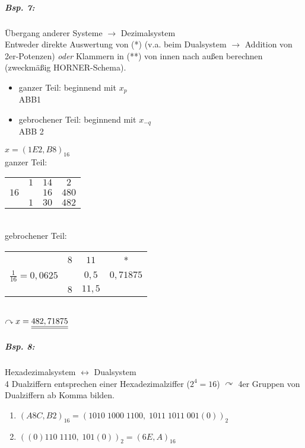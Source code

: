 \subparagraph{Bsp. 7:} Übergang anderer Systeme $\rightarrow$ Dezimalsystem\\
Entweder direkte Auswertung von (*) (v.a. beim Dualsystem $\rightarrow$ Addition von 2er-Potenzen) \emph{oder} Klammern in (**) von innen nach außen berechnen (zweckmäßig HORNER-Schema).
\begin{itemize}
\item ganzer Teil: beginnend mit $x_p$\\
ABB1 
\item gebrochener Teil: beginnend mit $x_{-q}$\\
ABB 2
\end{itemize}
$x=(1E2,B8)_{16}$\\
ganzer Teil:\\
\begin{tabular}{c | c c c}
 & $1$  &  $14$  & $2$\\
 $16$  &   & $16$  & $480$\\
 \hline
  & $1$ & $30$ & $\boxed{482}$\\

\end{tabular}\\
gebrochener Teil:\\
\begin{tabular}{c | c c c}
 & $8$  &  $11$  & *\\
 $\frac{1}{16}=0,0625$  &   & $0,5$  & $\boxed{0,71875}$\\
 \hline
  & $8$ & $11,5$ & \\
\end{tabular}\\
$\curvearrowright x=\underline{\underline{482,71875}}$

\subparagraph{Bsp. 8:} Hexadezimalsystem $\leftrightarrow$ Dualsystem\\
4 Dualziffern entsprechen einer Hexadezimalziffer ($2^4=16$) $\curvearrowright$ 4er Gruppen von Dualziffern ab Komma bilden.
\begin{enumerate}[label=\alph*.)]
\item $(A8C,B2)_{16}=(1010 \; 1000 \; 1100, \; 1011 \; 1011 \; 001(0))_2$
\item $((0)110\; 1110, \; 101(0))_2 = (6E,A)_{16}$
\end{enumerate}

